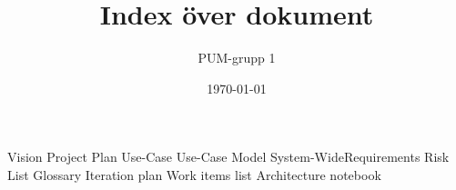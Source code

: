 

\ifpdf
\else
\fi

\title{Index över dokument}
\author{PUM-grupp 1}
\date{\today}



\maketitle\thispagestyle{empty}

\newpage

\begin{thebibliography}{99} %
 Vision
 Project Plan
 Use-Case
 Use-Case Model
 System-WideRequirements	
 Risk List
 Glossary
 Iteration plan
 Work items list
 Architecture notebook
\end{thebibliography}


